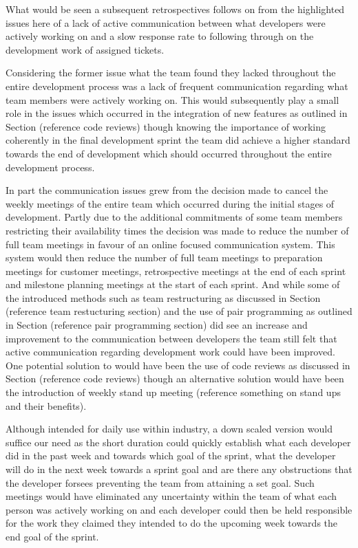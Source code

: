 \documentclass{l3proj}
\begin{document}
What would be seen a subsequent retrospectives follows on from the highlighted issues here of a lack of active communication between what developers were actively working on and a slow response rate to following through on the development work of assigned tickets. 

Considering the former issue what the team found they lacked throughout the entire development process was a lack of frequent communication regarding what team members were actively working on. This would subsequently play a small role in the issues which occurred in the integration of new features as outlined in Section (reference code reviews) though knowing the importance of working coherently in the final development sprint the team did achieve a higher standard towards the end of development which should occurred throughout the entire development process. 

In part the communication issues grew from the decision made to cancel the weekly meetings of the entire team which occurred during the initial stages of development. Partly due to the additional commitments of some team members restricting their availability times the decision was made to reduce the number of full team meetings in favour of an online focused communication system. This system would then reduce the number of full team meetings to preparation meetings for customer meetings, retrospective meetings at the end of each sprint and milestone planning meetings at the start of each sprint. And while some of the introduced methods such as team restructuring as discussed in Section (reference team restucturing section) and the use of pair programming as outlined in Section (reference pair programming section) did see an increase and improvement to the communication between developers the team still felt that active communication regarding development work could have been improved. One potential solution to would have been the use of code reviews as discussed in Section (reference code reviews) though an alternative solution would have been the introduction of weekly stand up meeting (reference something on stand ups and their benefits).

Although intended for daily use within industry, a down scaled version would suffice our need as the short duration could quickly establish what each developer did in the past week and towards which goal of the sprint, what the developer will do in the next week towards a sprint goal and are there any obstructions that the developer forsees preventing the team from attaining a set goal. Such meetings would have eliminated any uncertainty within the team of what each person was actively working on and each developer could then be held responsible for the work they claimed they intended to do the upcoming week towards the end goal of the sprint. 
\end{document}
